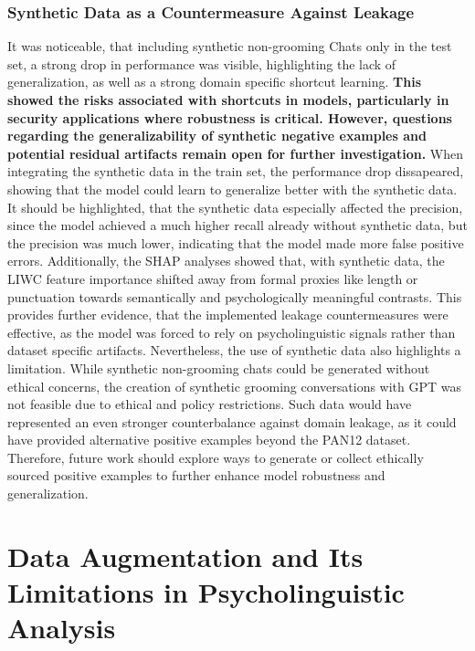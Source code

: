 \subsubsection{Synthetic Data as a Countermeasure Against Leakage}
It was noticeable, that including synthetic non-grooming Chats only in the test set, a strong drop in performance was visible, highlighting the lack of generalization, as well as a strong domain specific shortcut learning.  \textbf{This showed the risks associated with shortcuts in models, particularly in security applications where robustness is critical. However, questions regarding the generalizability of synthetic negative examples and potential residual artifacts remain open for further investigation.} When integrating the synthetic data in the train set, the performance drop dissapeared, showing that the model could learn to generalize better with the synthetic data. It should be highlighted, that the synthetic data especially affected the precision, since the model achieved a much higher recall already without synthetic data, but the precision was much lower, indicating that the model made more false positive errors. Additionally, the SHAP analyses showed that, with synthetic data, the LIWC feature importance shifted away from formal proxies like length or punctuation towards semantically and psychologically meaningful contrasts. This provides further evidence, that the implemented leakage countermeasures were effective, as the model was forced to rely on psycholinguistic signals rather than dataset specific artifacts. Nevertheless, the use of synthetic data also highlights a limitation. While synthetic non-grooming chats could be generated without ethical concerns, the creation of synthetic grooming conversations with GPT was not feasible due to ethical and policy restrictions. Such data would have represented an even stronger counterbalance against domain leakage, as it could have provided alternative positive examples beyond the PAN12 dataset. Therefore, future work should explore ways to generate or collect ethically sourced positive examples to further enhance model robustness and generalization.

\section{Data Augmentation and Its Limitations in Psycholinguistic Analysis}

